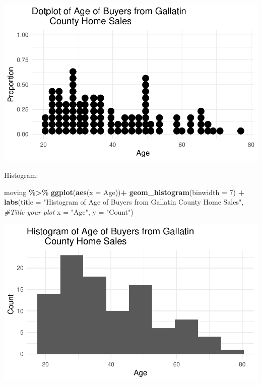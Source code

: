\documentclass[
]{report}
\newenvironment{Shaded}{\begin{snugshade}}{\end{snugshade}}
\newcommand{\AttributeTok}[1]{\textcolor[rgb]{0.13,0.29,0.53}{#1}}
\newcommand{\CommentTok}[1]{\textcolor[rgb]{0.56,0.35,0.01}{\textit{#1}}}
\newcommand{\DecValTok}[1]{\textcolor[rgb]{0.00,0.00,0.81}{#1}}
\newcommand{\FunctionTok}[1]{\textcolor[rgb]{0.13,0.29,0.53}{\textbf{#1}}}
\newcommand{\NormalTok}[1]{#1}
\newcommand{\SpecialCharTok}[1]{\textcolor[rgb]{0.81,0.36,0.00}{\textbf{#1}}}
\newcommand{\StringTok}[1]{\textcolor[rgb]{0.31,0.60,0.02}{#1}}
\begin{document}
\begin{center}\includegraphics[width=0.75\linewidth]{06-VN06-EDAonemeanSim_files/figure-latex/unnamed-chunk-2-1} \end{center}

\newpage

Histogram:

\vspace{0.2in}

\begin{Shaded}
\begin{Highlighting}[]
\NormalTok{moving }\SpecialCharTok{\%\textgreater{}\%}
  \FunctionTok{ggplot}\NormalTok{(}\FunctionTok{aes}\NormalTok{(}\AttributeTok{x =}\NormalTok{ Age))}\SpecialCharTok{+}
  \FunctionTok{geom\_histogram}\NormalTok{(}\AttributeTok{binwidth =} \DecValTok{7}\NormalTok{) }\SpecialCharTok{+} 
  \FunctionTok{labs}\NormalTok{(}\AttributeTok{title =} \StringTok{"Histogram of Age of Buyers from Gallatin }
\StringTok{       County Home Sales"}\NormalTok{,}
       \CommentTok{\#Title your plot}
       \AttributeTok{x =} \StringTok{"Age"}\NormalTok{,}
       \AttributeTok{y =} \StringTok{"Count"}\NormalTok{)}
\end{Highlighting}
\end{Shaded}

\begin{center}\includegraphics[width=0.7\linewidth]{06-VN06-EDAonemeanSim_files/figure-latex/unnamed-chunk-3-1} \end{center}
\end{document}
